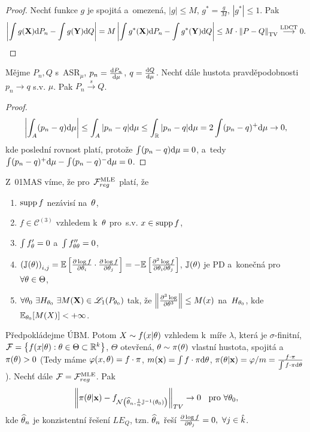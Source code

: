 \begin{proof}
	 Nechť funkce $g$ je spojitá a~omezená, $|g|\leq M$, $g^\ast =\frac{g}{M}$, $|g^\ast|\leq 1$. Pak
	$$ \left| \int g(\textbf{X})\mathrm{d} P_n-\int g(\textbf{Y})\mathrm{d} Q \right|=M\left| \int g^\ast(\textbf{X})\mathrm{d} P_n-\int g^\ast(\textbf{Y})\mathrm{d} Q \right|\leq M\cdot \left\| P-Q\right\|_{\mathrm{TV}} \stackrel{\text{LDCT}}{\longrightarrow} 0.$$
\end{proof}
\begin{theorem}
	Mějme $P_n,Q$ s~ASR$_\mu$, $p_n=\frac{\mathrm{d} P_n}{\mathrm{d} \mu}$, $q=\frac{\mathrm{d} Q}{\mathrm{d} \mu}$. Nechť dále hustota pravděpodobnosti $p_n\to q$ s.v. $\mu$. Pak $P_n\stackrel{s}{\longrightarrow}Q$. 
	\begin{proof}
		$$ \left| \int_A (p_n-q)\mathrm{d}\mu \right|\leq \int_A|p_n-q|\mathrm{d}\mu\leq \int_{\mathbb{R}}|p_n-q|\mathrm{d}\mu=2\int(p_n-q)^+\mathrm{d}\mu\to0,$$
		kde poslední rovnost platí, protože $\int(p_n-q)\mathrm{d}\mu=0$, a~tedy $\int(p_n-q)^+\mathrm{d}\mu-\int(p_n-q)^-\mathrm{d}\mu=0$.	\end{proof}
\end{theorem}
\begin{remark} Z~01MAS víme, že pro~$\mathcal{F}_{reg}^{\mathrm{{\footnotesize MLE }}}$ platí, že \begin{enumerate}[1)]
		\item $\mathop{\mathrm{supp}} f$ nezávisí na~$\theta$,
		\item $f\in\mathcal{C}^{(3)}$ vzhledem k~$\theta$ pro~s.v. $x\in\mathop{\mathrm{supp}} f$,
		\item $\int f_\theta'=0$ a~$\int f_{\theta\theta}''=0$,
		\item $\left( \mathbb{J}(\theta) \right)_{i,j}=\mathbb{E}\left[ \frac{\partial\log f}{\partial \theta_i}\cdot\frac{\partial\log f}{\partial \theta_j} \right]=-\mathbb{E}\left[ \frac{\partial^2 \log f}{\partial\theta_i \partial \theta_j} \right]$, $\mathbb{J}(\theta)$ je PD a~konečná pro~$\forall\theta\in\Theta$,
		\item $\forall\theta_0~\exists H_{\theta_0}~\exists M(\textbf{X})\in\mathscr{L}_1(P_{\theta_0})$ tak, že $\left\| \frac{\partial^3\log }{\partial \theta^3}\right\|\leq M(x)$ na~$H_{\theta_0}$, kde $\mathbb{E}_{\theta_0}[M(X)]<+\infty$.
	\end{enumerate}
\end{remark}
\begin{theorem}
	Předpokládejme ÚBM. Potom $X\sim f(x|\theta)$ vzhledem k~míře $\lambda$, která je $\sigma$-finitní, $\mathcal{F}=\left\{ f(x|\theta):\theta\in\Theta\subset \mathbb{R}^k \right\}$, $\Theta$ otevřená, $\theta\sim\pi(\theta)$ vlastní hustota, spojitá a~$\pi(\theta)>0$ (Tedy máme $\varphi(x,\theta)=f\cdot\pi$, $m(\textbf{x})=\int f\cdot \pi\mathrm{d}\theta$, $\pi(\theta|\textbf{x})=\varphi/m=\frac{f\cdot\pi}{\int f\cdot\pi\mathrm{d}\theta}$). Nechť dále $\mathcal{F}=\mathcal{F}_{reg}^{\mathrm{{\footnotesize MLE }}}$. Pak
	$$ \left\| \pi(\theta|\textbf{x})-f_{\mathcal{N}\left( \widehat{\theta}_n,\frac{1}{n}\mathbb{J}^{-1}(\theta_0) \right)} \right\|_{TV}\to0 \hspace{0.2cm}\text{ pro~}\forall \theta_0,$$
	kde $\widehat{\theta}_n$ je konzistentní řešení $LE_Q$, tzn. $\widehat{\theta}_n$ řeší $\frac{\partial \log f}{\partial \theta_j}=0,~\forall j\in\hat{k}$.
\end{theorem}
